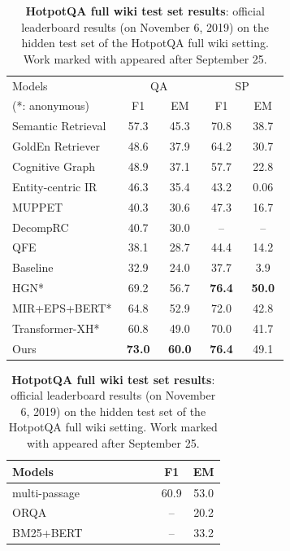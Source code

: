 \documentclass{article} \usepackage{iclr2020_conference,times}
\begin{document}
\begin{table}[!t] \hspace{-0.35cm}
\begin{minipage}[t]{0.50\linewidth}
    \centering
    \small{
\vspace{-0.1cm}
\begin{tabular}{ p{0.40\linewidth} | c c | cc  }\toprule 
  Models &\multicolumn{2}{c}{QA} & \multicolumn{2}{c}{SP}  \\
  (*: anonymous) & F1 & EM & F1 & EM \\
  \midrule
Semantic Retrieval & 57.3 & 45.3 & 70.8 & 38.7\\  
GoldEn Retriever & 48.6 & 37.9 & 64.2 & 30.7\\
Cognitive Graph  & 48.9 & 37.1 &57.7  & 22.8\\
Entity-centric IR &46.3 & 35.4 & 43.2 & 0.06\\
MUPPET  & 40.3 & 30.6  &47.3 & 16.7\\
DecompRC  & 40.7 & 30.0 & -- & -- \\
QFE & 38.1 & 28.7  &44.4 & 14.2\\ 
Baseline & 32.9 &  24.0 & 37.7& 3.9\\  \hdashline
HGN* & 69.2 & 56.7 & \bf 76.4 & \bf 50.0 \\
MIR+EPS+BERT* & 64.8 & 52.9 & 72.0 & 42.8\\
Transformer-XH* & 60.8 & 49.0 & 70.0 & 41.7\\
\hline
  Ours & \bf 73.0 & \bf 60.0 & \bf 76.4	& 49.1\\
\bottomrule
\end{tabular}
    \caption{{\bf HotpotQA full wiki test set results}: official leaderboard results (on November 6, 2019) on the hidden test set of the HotpotQA full wiki setting. Work marked with  appeared after September 25.}\label{table:test_results_hotpot_qa}
    }
\end{minipage}
\hspace{0.2cm}
\begin{minipage}[t]{.5\linewidth} \vspace{-0.1cm}
    \centering
    \small{
\begin{tabular}{ p{0.7\linewidth} | c c }\toprule 
 Models  & F1 & EM  \\
  \midrule
multi-passage ~\citep{multipassage-bert-2019} & 60.9 & 53.0 \\
ORQA~\citep{lee-chang-toutanova:2019:ACL2019} & --  & 20.2  \\
BM25+BERT~\citep{lee-chang-toutanova:2019:ACL2019} & --  & 33.2  \\

\end{tabular}}
\end{minipage}
\end{table}
\end{document}
